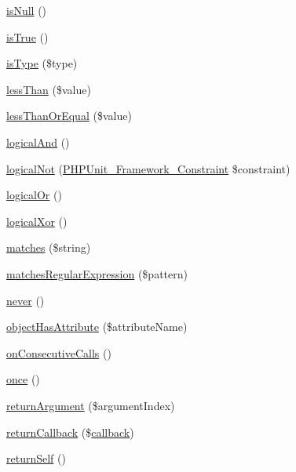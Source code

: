 \begin{DoxyCompactItemize}
\mbox{\hyperlink{_functions_8php_a4af7cea238ab52f6e40a1eed86bdc1be}{is\+Null}} ()
\item 
\mbox{\hyperlink{_functions_8php_a3c9249e55831fca5b37d7afc0df9216c}{is\+True}} ()
\item 
\mbox{\hyperlink{_functions_8php_a72810c431795eef57c10cec4a620807a}{is\+Type}} (\$type)
\item 
\mbox{\hyperlink{_functions_8php_a6129cde2908aad852772b7b5ac5e1191}{less\+Than}} (\$value)
\item 
\mbox{\hyperlink{_functions_8php_ab1eb2e4bdbacc1ced86eb0c4cf7c266a}{less\+Than\+Or\+Equal}} (\$value)
\item 
\mbox{\hyperlink{_functions_8php_ae731cc8816139b076c1f231cc29628f6}{logical\+And}} ()
\item 
\mbox{\hyperlink{_functions_8php_a6b3abe020c7872df97f29de1e16cf485}{logical\+Not}} (\mbox{\hyperlink{class_p_h_p_unit___framework___constraint}{P\+H\+P\+Unit\+\_\+\+Framework\+\_\+\+Constraint}} \$constraint)
\item 
\mbox{\hyperlink{_functions_8php_a9765b90f16412c9210fe50cc301eb9af}{logical\+Or}} ()
\item 
\mbox{\hyperlink{_functions_8php_ab864cff8b3135268437a09c54fab34ee}{logical\+Xor}} ()
\item 
\mbox{\hyperlink{_functions_8php_a8968a55c84671473daa2233e6cae65b8}{matches}} (\$string)
\item 
\mbox{\hyperlink{_functions_8php_af2ef74284024d6308cd69bc4a2ce2df4}{matches\+Regular\+Expression}} (\$pattern)
\item 
\mbox{\hyperlink{_functions_8php_a5f3c11b90fed1f1f1cd123af8f802285}{never}} ()
\item 
\mbox{\hyperlink{_functions_8php_aa56578de5940440fff547d12ef8c708c}{object\+Has\+Attribute}} (\$attribute\+Name)
\item 
\mbox{\hyperlink{_functions_8php_a9d664791c3ed0e1be32a2fc06fb8f349}{on\+Consecutive\+Calls}} ()
\item 
\mbox{\hyperlink{_functions_8php_adf61c548bd057a260bb851f898749157}{once}} ()
\item 
\mbox{\hyperlink{_functions_8php_a8195d1a7e82b5a06e93ac75338d4f267}{return\+Argument}} (\$argument\+Index)
\item 
\mbox{\hyperlink{_functions_8php_a5180e79959c104a66fdb4d790ffd2c5a}{return\+Callback}} (\$\mbox{\hyperlink{_functions_8php_ae2242eb47799ca6a822b022dc1bd1ac9}{callback}})
\item 
\mbox{\hyperlink{_functions_8php_a90267a3fad433bb96e91c6b0c7d50a70}{return\+Self}} ()

\end{DoxyCompactItemize}
